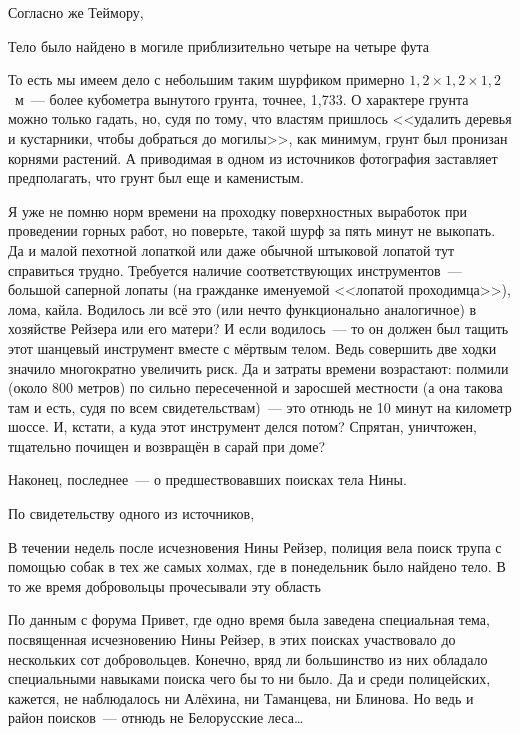 Согласно же Теймору, 

\begin{shadequote}{}
Тело было найдено в могиле приблизительно четыре на четыре фута 
\end{shadequote}

То есть мы имеем дело с небольшим таким шурфиком примерно $1,2\times1,2\times1,2$~м~--- более кубометра вынутого грунта, точнее, 1,733. О характере грунта можно только гадать, но, судя по тому, что властям пришлось <<удалить деревья и кустарники, чтобы добраться до могилы>>, как минимум, грунт был пронизан корнями растений. А приводимая в одном из источников фотография заставляет предполагать, что грунт был еще и каменистым. 

Я уже не помню норм времени на проходку поверхностных выработок при проведении горных работ, но поверьте, такой шурф за пять минут не выкопать. Да и малой пехотной лопаткой или даже обычной штыковой лопатой тут справиться трудно. Требуется наличие соответствующих инструментов~--- большой саперной лопаты (на гражданке именуемой <<лопатой проходимца>>), лома, кайла. Водилось ли всё это (или нечто функционально аналогичное) в хозяйстве Рейзера или его матери? И если водилось~--- то он должен был тащить этот шанцевый инструмент вместе с мёртвым телом. Ведь совершить две ходки значило многократно увеличить риск. Да и затраты времени возрастают: полмили (около 800 метров) по сильно пересеченной и заросшей местности (а она такова там и есть, судя по всем свидетельствам)~--- это отнюдь не 10 минут на километр шоссе. И, кстати, а куда этот инструмент делся потом? Спрятан, уничтожен, тщательно почищен и возвращён в сарай при доме? 

Наконец, последнее~--- о предшествовавших поисках тела Нины. 

По свидетельству одного из источников, 


\begin{shadequote}{}
В течении недель после исчезновения Нины Рейзер, полиция вела поиск трупа с помощью собак в тех же самых холмах, где в понедельник было найдено тело. В то же время добровольцы прочесывали эту область 
\end{shadequote}

По данным с форума Привет, где одно время была заведена специальная тема, посвященная исчезновению Нины Рейзер, в этих поисках участвовало до нескольких сот добровольцев. Конечно, вряд ли большинство из них обладало специальными навыками поиска чего бы то ни было. Да и среди полицейских, кажется, не наблюдалось ни Алёхина, ни Таманцева, ни Блинова. Но ведь и район поисков~--- отнюдь не Белорусские леса\dots 


